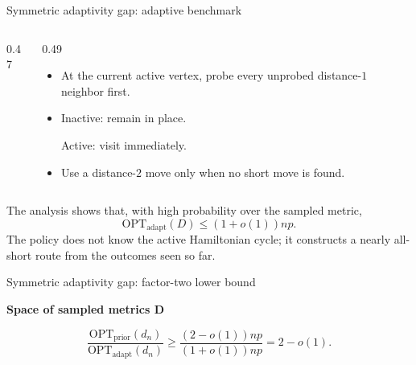 \documentclass[aspectratio=169,12pt]{beamer}
\newcommand{\OPT}{\mathrm{OPT}}
\newcommand{\optadapt}{\OPT_{\mathrm{adapt}}}
\newcommand{\optprior}{\OPT_{\mathrm{prior}}}
\begin{document}
\begin{frame}{Symmetric adaptivity gap: adaptive benchmark}
  \begin{columns}[c,onlytextwidth]
    \begin{column}{0.47\textwidth}
      \centering
      \resizebox{0.96\linewidth}{!}{\ThShortNeighborPolicy}
    \end{column}
    \begin{column}{0.49\textwidth}
      \begin{itemize}\setlength{\itemsep}{0.58em}
        \item At the current active vertex, probe every unprobed
          distance-\(1\) neighbor first.
        \item Inactive: remain in place.

            Active: visit immediately.
        \item Use a distance-\(2\) move only when no short move is found.
      \end{itemize}
    \end{column}
  \end{columns}

  \medskip
  The analysis shows that, with high probability over the sampled metric,
  \[
    \optadapt(D)\le(1+o(1))np.
  \]
  The policy does not know the active Hamiltonian cycle; it constructs a
  nearly all-short route from the outcomes seen so far.
\end{frame}

\begin{frame}{Symmetric adaptivity gap: factor-two lower bound}
  \centering
  {\small\bfseries Space of sampled metrics \(\mathbf{D}\)\par}
  \smallskip
  \resizebox{0.76\linewidth}{!}{\ThGoodMetricIntersection}

  \medskip
  \[
    \frac{\optprior(d_n)}{\optadapt(d_n)}
    \ge \frac{(2-o(1))np}{(1+o(1))np}=2-o(1).
  \]
\end{frame}
\end{document}
